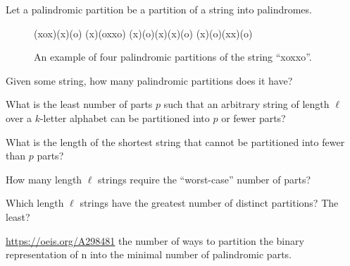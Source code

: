 \documentclass{article}
\begin{document}
  Let a palindromic partition be a partition of a string into palindromes.
  \begin{figure}[!h]
    \centering
    (xox)(x)(o) \hspace{0.5cm} (x)(oxxo) \hspace{0.5cm} (x)(o)(x)(x)(o) \hspace{0.5cm} (x)(o)(xx)(o)
    \caption{
      An example of four palindromic partitions of the string ``xoxxo''.
    }
  \end{figure}
\begin{question}
  Given some string, how many palindromic partitions does it have?
\end{question}
\begin{related}
  \item What is the least number of parts $p$ such that an arbitrary string of
    length $\ell$ over a $k$-letter alphabet can be partitioned into $p$ or
    fewer parts?
  \item What is the length of the shortest string that cannot be partitioned
    into fewer than $p$ parts?
  \item How many length $\ell$ strings require the ``worst-case'' number of
    parts?
  \item Which length $\ell$ strings have the greatest number of distinct
    partitions? The least?
\end{related}
\begin{references}
  \item \url{https://oeis.org/A298481} the number of ways to partition the
    binary representation of n into the minimal number of palindromic parts.
\end{references}
\end{document}

